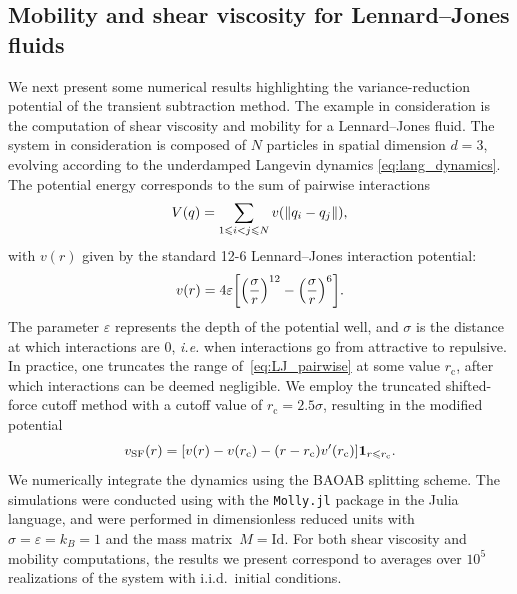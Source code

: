 \subsection{Mobility and shear viscosity for Lennard--Jones fluids}
\label{subsec:num_LJ}
%
We next present some numerical results highlighting the variance-reduction potential of the transient subtraction method. The example in consideration is the computation of shear viscosity and mobility for a Lennard--Jones fluid. The system in consideration is composed of $N$ particles in spatial dimension $d=3$, evolving according to the underdamped Langevin dynamics \eqref{eq:lang_dynamics}. The potential energy corresponds to the sum of pairwise interactions
%
\begin{equation}
	V(q) = \sum_{1\leqslant i<j\leqslant N} v(\lVert q_i - q_j\rVert),
\end{equation}
%
with $v(r)$ given by the standard 12-6 Lennard--Jones interaction potential:
%
\begin{equation}
	v(r) = 4\eps\bkt*{\paren*{\frac{\sigma}{r}}^{12} - \paren*{\frac{\sigma}{r}}^6}.
	\label{eq:LJ_pairwise}
\end{equation}
%
The parameter $\varepsilon$ represents the depth of the potential well, and $\sigma$ is the distance at which interactions are 0, \emph{i.e.} when interactions go from attractive to repulsive. In practice, one truncates the range of~\eqref{eq:LJ_pairwise} at some value $r_\mathrm{c}$, after which interactions can be deemed negligible. We employ the truncated shifted-force cutoff method with a cutoff value of $r_\mathrm{c}=2.5\sigma$, resulting in the modified potential
%
\begin{equation}
	v_\mathrm{SF}(r) = [v(r) - v(r_\mathrm{c}) - (r - r_\mathrm{c})v'(r_\mathrm{c})]\mathbf{1}_{r\leqslant r_\mathrm{c}}.
\end{equation}
%  
We numerically integrate the dynamics using the BAOAB splitting scheme. The simulations were conducted using with the \texttt{Molly.jl} package \cite{greener2024} in the Julia language, and were performed in dimensionless reduced units with $\sigma = \varepsilon = k_B = 1$ and the mass matrix~$M = \mathrm{Id}$. For both shear viscosity and mobility computations, the results we present correspond to averages over $10^5$ realizations of the system with i.i.d.\ initial conditions. 

